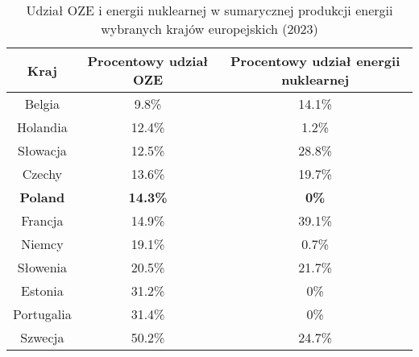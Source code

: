 \begin{columns}[T]
    \begin{column}{\textwidth}
        \begin{table}[h]
            \footnotesize
            \begin{tabular}{c|c|c}
                \toprule
                \textbf{Kraj} & Procentowy udział OZE & Procentowy udział energii nuklearnej \\
                \midrule
                Belgia & 9.8\% & 14.1\%\\
                Holandia & 12.4\% & 1.2\% \\
                Słowacja & 12.5\% & 28.8\% \\
                Czechy & 13.6\% & 19.7\% \\
                \textcolor{renewable}{\textbf{Poland}} & \textcolor{renewable}{\textbf{14.3\%}} & \textcolor{renewable}{\textbf{0\%}}\\
                Francja & 14.9\% & 39.1\% \\
                Niemcy & 19.1\% & 0.7\% \\
                Słowenia & 20.5\% & 21.7\% \\
                \rowcolor{green!10}
                Estonia & 31.2\% & 0\% \\
                 \rowcolor{green!10}
                Portugalia & 31.4\% & 0\% \\
                \rowcolor{green!10}
                Szwecja & 50.2\% & 24.7\% \\
                \bottomrule
            \end{tabular}
            \caption{Udział OZE i energii nuklearnej w sumarycznej produkcji energii wybranych krajów europejskich (2023)}
        \end{table}
    \end{column}
\end{columns}
